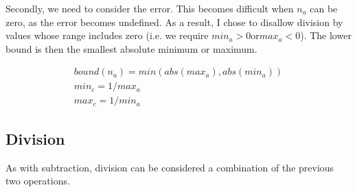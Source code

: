 \documentclass[10pt,a4paper]{article}
\numberwithin{equation}{section}
\numberwithin{equation}{subsection}
\begin{document}
	Secondly, we need to consider the error. This becomes difficult when $n_a$ can be zero, as the error becomes undefined. As a result, I chose to disallow division by values whose range includes zero (i.e. we require $min_a > 0 \text{or} max_a < 0$). The lower bound is then the smallest absolute minimum or maximum.
	
	\begin{eqnarray}
		bound(n_a) = min(abs(max_a),abs(min_a)) \\
		min_c = 1/max_a \\
		max_c = 1/min_a
	\end{eqnarray}
	
	\subsection{Division}
	
	As with subtraction, division can be considered a combination of the previous two operations.
	
	
	
\end{document}
